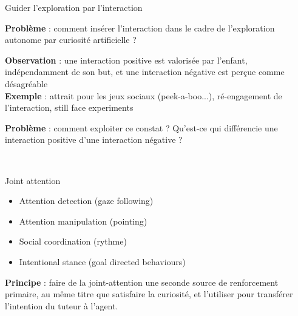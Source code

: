 \documentclass[xcolor=pst,dvips,12pt,english,french]{beamer}
\begin{document}
	\begin{frame}{Guider l'exploration par l'interaction}
		\begin{block}{}
			\textbf{Problème} : comment insérer l'interaction dans le cadre de l'exploration autonome par curiosité artificielle ?
		\end{block}
		\begin{exampleblock}{}
			\textbf{Observation} : une interaction positive est valorisée par l'enfant, indépendamment de son but, et une interaction négative est perçue comme désagréable\\
			\textbf{Exemple} : attrait pour les jeux sociaux (peek-a-boo...), ré-engagement de l'interaction, still face experiments
		\end{exampleblock}
		\begin{alertblock}{}
			\textbf{Problème} : comment exploiter ce constat ? Qu'est-ce qui différencie une interaction positive d'une interaction négative ?
		\end{alertblock}
		\vfill
		\tiny
		\\
	\end{frame}
	
	\begin{frame}{Joint attention}
		\begin{block}{}
			\begin{itemize}
				\item Attention detection (gaze following) 
				\item Attention manipulation (pointing)
				\item Social coordination (rythme)
				\item Intentional stance (goal directed behaviours)
			\end{itemize}
		\end{block}
		\begin{exampleblock}{}
			\textbf{Principe} : faire de la joint-attention une seconde source de renforcement primaire, au même titre que satisfaire la curiosité, et l'utiliser pour transférer l'intention du tuteur à l'agent.
		\end{exampleblock}	
		\vfill
		\tiny
	\end{frame}
	
\end{document}
